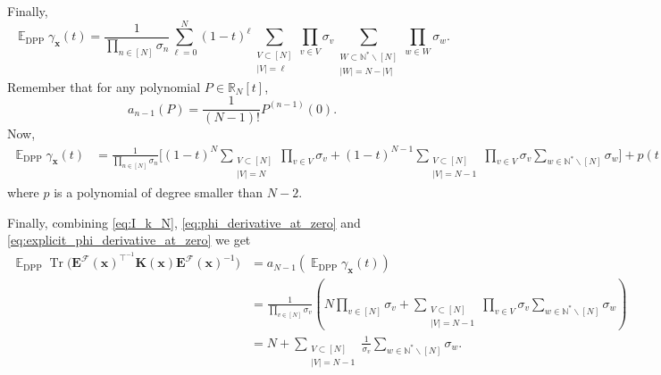 \documentclass[twoside,11pt]{book}
\numberwithin{theorem}{chapter}
\numberwithin{definition}{chapter}
\numberwithin{proposition}{chapter}
\numberwithin{corollary}{chapter}
\numberwithin{example}{chapter}
\numberwithin{lemma}{chapter}
\numberwithin{assumption}{chapter}
\DeclareMathOperator{\Tr}{Tr}
\DeclareMathOperator{\DPP}{\mathrm{DPP}}
\DeclareMathOperator{\Tran}{\intercal}
\DeclareMathOperator{\EX}{\mathbb{E}}
\begin{document}
Finally,
\begin{equation}
\EX_{\DPP} \gamma_{\bm{x}}(t) = \frac{1}{\prod\limits_{n \in [N]}\sigma_n} \sum\limits_{\ell =0}^{N} (1-t)^{\ell} \sum\limits_{\substack{V \subset [N]\\|V| = \ell}} \prod\limits_{v \in V}\sigma_{v}  \sum\limits_{\substack{W \subset \mathbb{N}^{*} \smallsetminus[N]\\  |W|= N-|V|}}  \prod\limits_{w \in W}\sigma_{w}.
\end{equation}
Remember that for any polynomial $P \in \mathbb{R}_{N}[t]$, 
\begin{equation}
a_{n-1}(P) = \frac{1}{(N-1)!}P^{(n-1)}(0).
\end{equation}
Now,
\begin{align}
\EX_{\DPP} \gamma_{\bm{x}}(t) & = \frac{1}{\prod\limits_{n \in [N]}\sigma_n} \Big[ (1-t)^{N} \sum\limits_{\substack{V \subset [N]\\|V| = N}} \prod\limits_{v \in V}\sigma_{v}  + (1-t)^{N-1} \sum\limits_{\substack{V \subset [N]\\|V| = N-1}} \prod\limits_{v \in V}\sigma_{v}  \sum\limits_{w \in \mathbb{N}^{*} \smallsetminus [N]} \sigma_{w} \Big] +p(t),
\end{align}
where $p$ is a polynomial of degree smaller than $N-2$.



Finally, combining \eqref{eq:I_k_N}, \eqref{eq:phi_derivative_at_zero} and \eqref{eq:explicit_phi_derivative_at_zero} we get
\begin{align}
\EX_{\DPP}  \Tr \bigg(  \bm{E}^{\mathcal{F}}(\bm{x})^{\Tran^{-1}}\bm{K}(\bm{x})\bm{E}^{\mathcal{F}}(\bm{x})^{-1} \bigg) & = a_{N-1}(\EX_{\DPP} \gamma_{\bm{x}}(t))\\
& = \frac{1}{\prod\limits_{v \in [N]}\sigma_{v}} \left( N\prod\limits_{v \in [N]}\sigma_{v} + \sum\limits_{\substack{V \subset [N]\\ |V| = N-1}} \prod\limits_{v \in V}\sigma_{v} \sum\limits_{w \in \mathbb{N}^{*}\smallsetminus [N]} \sigma_{w} \right) \nonumber\\
& =  N + \sum\limits_{\substack{V \subset [N]\\ |V| = N-1}} \frac{1}{\sigma_{v}} \sum\limits_{w \in \mathbb{N}^{*}\smallsetminus [N]} \sigma_{w} .
\end{align}
\end{document}
